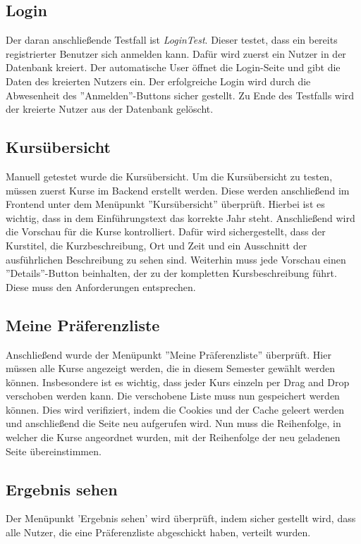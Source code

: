 		\subsection{Login}
			Der daran anschließende Testfall ist \textit{LoginTest}.
			Dieser testet, dass ein bereits registrierter Benutzer sich anmelden kann.
			Dafür wird zuerst ein Nutzer in der Datenbank kreiert.
			Der automatische User öffnet die Login-Seite und gibt die Daten des kreierten Nutzers ein.
			Der erfolgreiche Login wird durch die Abwesenheit des ''Anmelden''-Buttons sicher gestellt.
			Zu Ende des Testfalls wird der kreierte Nutzer aus der Datenbank gelöscht.\newline
		
		\subsection{Kursübersicht}
			Manuell getestet wurde die Kursübersicht.
			Um die Kursübersicht zu testen, müssen zuerst Kurse im Backend erstellt werden.
			Diese werden anschließend im Frontend unter dem Menüpunkt ''Kursübersicht'' überprüft.
			Hierbei ist es wichtig, dass in dem Einführungstext das korrekte Jahr steht.
			Anschließend wird die Vorschau für die Kurse kontrolliert.
			Dafür wird sichergestellt, dass der Kurstitel, die Kurzbeschreibung, Ort und Zeit und ein Ausschnitt der ausführlichen Beschreibung zu sehen sind.
			Weiterhin muss jede Vorschau einen ''Details''-Button beinhalten, der zu der kompletten Kursbeschreibung führt.
			Diese muss den Anforderungen entsprechen.\newline
		
		\subsection{Meine Präferenzliste}
			Anschließend wurde der Menüpunkt ''Meine Präferenzliste'' überprüft.
			Hier müssen alle Kurse angezeigt werden, die in diesem Semester gewählt werden können.
			Insbesondere ist es wichtig, dass jeder Kurs einzeln per Drag and Drop verschoben werden kann.
			Die verschobene Liste muss nun gespeichert werden können.
			Dies wird verifiziert, indem die Cookies und der Cache geleert werden und anschließend die Seite neu aufgerufen wird.
			Nun muss die Reihenfolge, in welcher die Kurse angeordnet wurden, mit der Reihenfolge der neu geladenen Seite übereinstimmen.\newline
		
		\subsection{Ergebnis sehen}
			Der Menüpunkt 'Ergebnis sehen' wird überprüft, indem sicher gestellt wird, dass alle Nutzer, die eine Präferenzliste abgeschickt haben, verteilt wurden.\newline
		
